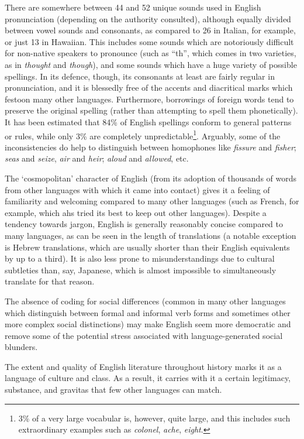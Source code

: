 \documentclass[../main.tex]{subfiles}
\begin{document}
        There are somewhere between 44 and 52 unique sounds used in English pronunciation (depending on the authority consulted), although equally divided between vowel sounds and consonants, as compared to 26 in Italian, for example, or just 13 in Hawaiian. This includes some sounds which are notoriously difficult for non-native speakers to pronounce (such as ``th'', which comes in two varieties, as in \textit{thought} and \textit{though}), and some sounds which have a huge variety of possible spellings. In its defence, though, its consonants at least are fairly regular in pronunciation, and it is blessedly free of the accents and diacritical marks which festoon many other languages. Furthermore, borrowings of foreign words tend to preserve the original spelling (rather than attempting to spell them phonetically). It has been estimated that 84\% of English spellings conform to general patterns or rules, while only 3\% are completely unpredictable\footnote{3\% of a very large vocabular is, however, quite large, and this includes such extraordinary examples such as \textit{colonel}, \textit{ache}, \textit{eight}.}. Arguably, some of the inconsistencies do help to distinguish between homophones like \textit{fissure} and \textit{fisher}; \textit{seas} and \textit{seize}, \textit{air} and \textit{heir}; \textit{aloud} and \textit{allowed}, etc. \par
        The `cosmopolitan' character of English (from its adoption of thousands of words from other languages with which it came into contact) gives it a feeling of familiarity and welcoming compared to many other languages (such as French, for example, which ahs tried its best to keep out other languages). Despite a tendency towards jargon, English is generally reasonably concise compared to many languages, as can be seen in the length of translations (a notable exception is Hebrew translations, which are usually shorter than their English equivalents by up to a third). It is also less prone to misunderstandings due to cultural subtleties than, say, Japanese, which is almost impossible to simultaneously translate for that reason. \par
        The absence of coding for social differences (common in many other languages which distinguish between formal and informal verb forms and sometimes other more complex social distinctions) may make English seem more democratic and remove some of the potential stress associated with language-generated social blunders. \par 
        The extent and quality of English literature throughout history marks it as a language of culture and class. As a result, it carries with it a certain legitimacy, substance, and gravitas that few other languages can match.
\end{document}
